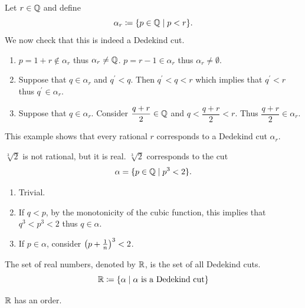 \begin{example}
Let $r\in\mathbb Q$ and define
\[ \alpha_r\coloneqq\{p\in\mathbb Q\mid p<r\}. \]
We now check that this is indeed a Dedekind cut.
\begin{enumerate}[label=(\arabic*)]
\item $p=1+r\notin\alpha_r$ thus $\alpha_r\neq\mathbb Q$. $p=r-1\in\alpha_r$ thus $\alpha_r\neq\emptyset$.

\item Suppose that $q\in\alpha_r$ and $q^\prime<q$. Then $q^\prime<q<r$ which implies that $q^\prime<r$ thus $q^\prime\in\alpha_r$.

\item Suppose that $q\in\alpha_r$. Consider $\dfrac{q+r}{2}\in\mathbb Q$ and $q<\dfrac{q+r}{2}<r$. Thus $\dfrac{q+r}{2}\in\alpha_r$.
\end{enumerate}
\end{example}

This example shows that every rational $r$ corresponds to a Dedekind cut $\alpha_r$.

\begin{example}
$\sqrt[3]{2}$ is not rational, but it is real. $\sqrt[3]{2}$ corresponds to the cut
\[ \alpha=\{p\in\mathbb Q\mid p^3<2\}. \]
\begin{enumerate}[label=(\arabic*)]
\item Trivial.
\item If $q<p$, by the monotonicity of the cubic function, this implies that $q^3<p^3<2$ thus $q\in\alpha$.
\item If $p\in\alpha$, consider $\left(p+\frac{1}{n}\right)^3<2$.
\end{enumerate}
\end{example}

\begin{definition}
The set of real numbers, denoted by $\mathbb R$, is the set of all Dedekind cuts.
\[ \mathbb R\coloneqq\{\alpha\mid\alpha\text{ is a Dedekind cut}\} \]
\end{definition}

\begin{proposition}
$\mathbb R$ has an order.
\end{proposition}

